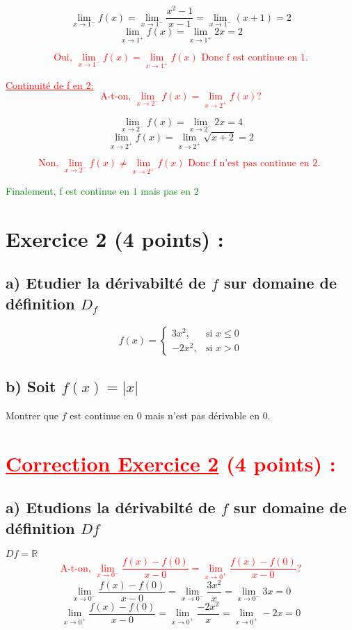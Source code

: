 \documentclass[12pt]{article}
\begin{document}
\[\lim_{x \to 1^{-}}f(x)=\lim_{x \to 1^{-}}\frac{x^2-1}{x-1}=\lim_{x \to 1^{-}}(x+1)=2\]
\[\lim_{x \to 1^{+}}f(x)=\lim_{x \to 1^{+}}2x=2\]

\textcolor{red}{\[\text{Oui, } \lim_{x \to 1^{-}}f(x)=\lim_{x \to 1^{+}}f(x)\text{ Donc f est continue en 1.}\]}

\textcolor{red}{\underline{Continuité de f en 2:}}
\textcolor{red}{\[\text{A-t-on, } \lim_{x \to 2^{-}}f(x)=\lim_{x \to 2^{+}}f(x) ?\]}

\[\lim_{x \to 2^{-}}f(x)=\lim_{x \to 2^{-}}2x=4\]
\[\lim_{x \to 2^{+}}f(x)=\lim_{x \to 2^{+}}\sqrt{x+2}=2\]

\textcolor{red}{\[\text{Non, } \lim_{x \to 2^{-}}f(x)\neq\lim_{x \to 2^{+}}f(x)\text{ Donc f n'est pas continue en 2. }\]}

\textcolor{green}{Finalement, f est continue en $1$ mais pas en $2$}
\section*{Exercice 2 (4 points) :}
\subsection*{a) Etudier la dérivabilté de $f$ sur domaine de définition $D_{f}$}
\[ f(x) = \begin{cases} 
  3x^{2}, & \text{si } x \leq 0 \\
  -2x^{2}, & \text{si } x > 0 
\end{cases} \]
\subsection*{b) Soit $f(x)=|x|$ }
Montrer que $f$ est continue en 0 mais n'est pas dérivable en 0.
\section*{\textcolor{red}{\underline{Correction Exercice 2} (4 points) :}}
\subsection*{a) Etudions la dérivabilté de $f$ sur domaine de définition $Df$}
$Df=\mathbb{R}$
\textcolor{red}{\[\text{A-t-on, } \lim_{x \to 0^{-}}\frac{f(x)-f(0)}{x-0}=\lim_{x \to 0^{+}}\frac{f(x)-f(0)}{x-0}?\]}
\[\lim_{x \to 0^{-}}\frac{f(x)-f(0)}{x-0}=\lim_{x \to 0^{-}}\frac{3x^{2}}{x}=\lim_{x \to 0^{-}}3x=0\]
\[\lim_{x \to 0^{+}}\frac{f(x)-f(0)}{x-0}=\lim_{x \to 0^{+}}\frac{-2x^{2}}{x}=\lim_{x \to 0^{+}}-2x=0\]
\end{document}

